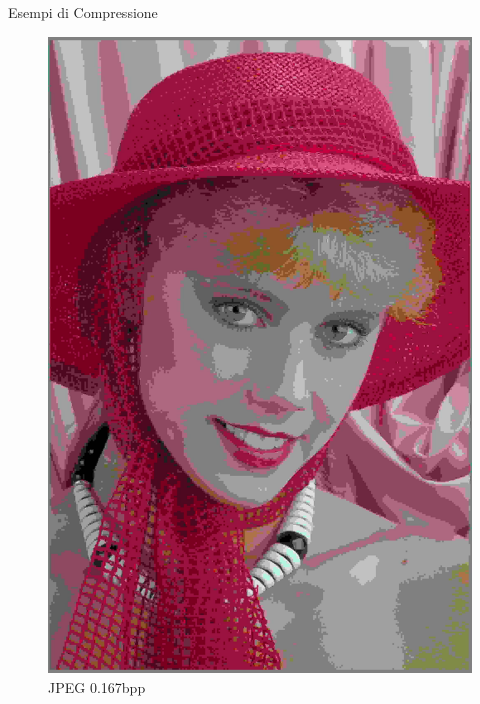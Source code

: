 \begin{frame}{Esempi di Compressione}
\begin{figure}[!ht]
\begin{minipage}[]{0.13\linewidth}
            \end{minipage}
            \begin{minipage}[]{0.13\linewidth}
                \centering
                \includegraphics[width=\textwidth]{Immagini/IMAGES/JPEG_1_IMG0004.pdf}
                \caption{JPEG 0.167bpp}
                \label{fig:ExampleJPEG}
            \end{minipage}
            \begin{minipage}[]{0.13\linewidth}
                \centering

\end{minipage}
\end{figure}
\end{frame}
